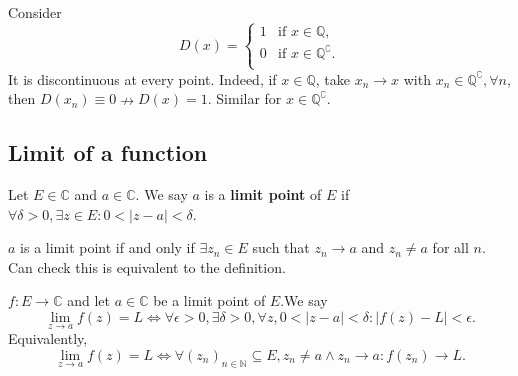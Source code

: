 \begin{example}
    Consider 
    \[
        D(x) = \begin{cases}
        1 &\text{if }x\in \mathbb{Q}, \\
        0 &\text{if }x\in \mathbb{Q}^\complement.\\
        \end{cases} 
    \]
    It is discontinuous at every point. Indeed, if $x\in \mathbb{Q}$, take $x_n\to x$ with $ x_n\in \mathbb{Q}^\complement,\forall n $, then $ D(x_n)\equiv 0 \nrightarrow D(x)=1 $. Similar for $ x\in \mathbb{Q}^\complement $.
\end{example}

\subsection{Limit of a function}
\begin{definition}
    Let $ E\in \mathbb{C} $ and $ a\in \mathbb{C} $. We say $a$ is a \textbf{limit point} of $E$ if $ \forall \delta>0, \exists z\in E: 0<\left| z-a \right| <\delta $.
    \begin{center}
    \end{center}
\end{definition}
\begin{remark}
    $a$ is a limit point if and only if $ \exists z_n\in E $ such that $ z_n\to a $ and $ z_n\neq a $ for all $n$. Can check this is equivalent to the definition.
\end{remark}

\begin{definition}
    $ f:E\to \mathbb{C} $ and let $ a\in \mathbb{C} $ be a limit point of $E$.We say 
    \[
        \lim_{z \to a} f(z) = L \Longleftrightarrow \forall \epsilon>0, \exists \delta>0, \forall z,0< \left| z-a \right| <\delta: \left| f(z)-L \right|< \epsilon.
    \]
    Equivalently,
    \[
        \lim_{z \to a} f(z)=L \Leftrightarrow \forall (z_n)_{n\in\mathbb{N}} \subseteq E, z_n\neq a \land z_n\to a: f(z_n)\to L.
    \]
\end{definition}


